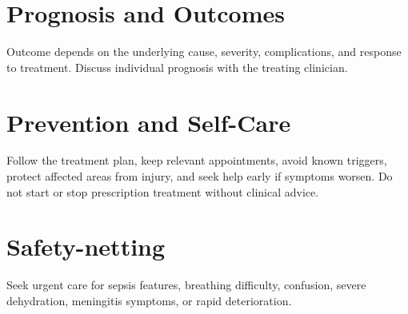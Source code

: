 \section*{Prognosis and Outcomes}
Outcome depends on the underlying cause, severity, complications, and response to treatment. Discuss individual prognosis with the treating clinician.

\section*{Prevention and Self-Care}
Follow the treatment plan, keep relevant appointments, avoid known triggers, protect affected areas from injury, and seek help early if symptoms worsen. Do not start or stop prescription treatment without clinical advice.
\section*{Safety-netting}
Seek urgent care for sepsis features, breathing difficulty, confusion, severe dehydration, meningitis symptoms, or rapid deterioration.
